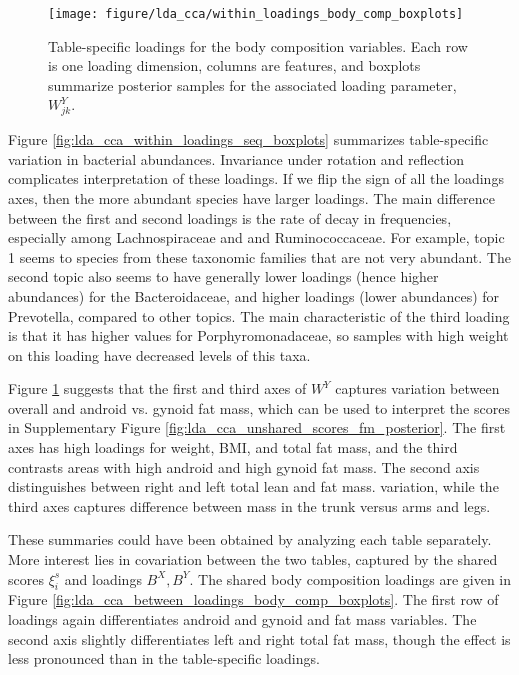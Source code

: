\documentclass{article}
\begin{document}
\begin{figure}
  \centering
  \texttt{[image: figure/lda\_cca/within\_loadings\_body\_comp\_boxplots]}
  \caption{Table-specific loadings for the body composition variables. Each row
    is one loading dimension, columns are features, and boxplots summarize
    posterior samples for the associated loading parameter, $W_{jk}^{Y}$.
  \label{fig:lda_cca_within_loadings_body_comp_boxplots}}
\end{figure}

Figure \ref{fig:lda_cca_within_loadings_seq_boxplots} summarizes table-specific
variation in bacterial abundances. Invariance under rotation and reflection
complicates interpretation of these loadings. If we flip the sign of all the
loadings axes, then the more abundant species have larger loadings. The main
difference between the first and second loadings is the rate of decay in
frequencies, especially among Lachnospiraceae and and Ruminococcaceae. For
example, topic 1 seems to species from these taxonomic families that are not
very abundant. The second topic also seems to have generally lower loadings
(hence higher abundances) for the Bacteroidaceae, and higher loadings (lower
abundances) for Prevotella, compared to other topics. The main characteristic of
the third loading is that it has higher values for Porphyromonadaceae, so
samples with high weight on this loading have decreased levels of this taxa.

Figure \ref{fig:lda_cca_within_loadings_body_comp_boxplots} suggests that the
first and third axes of $W^{Y}$ captures variation between overall and android
vs. gynoid fat mass, which can be used to interpret the scores in Supplementary
Figure \ref{fig:lda_cca_unshared_scores_fm_posterior}. The first axes has high
loadings for weight, BMI, and total fat mass, and the third contrasts areas with
high android and high gynoid fat mass. The second axis distinguishes between
right and left total lean and fat mass. variation, while the third axes captures
difference between mass in the trunk versus arms and legs.

These summaries could have been obtained by analyzing each table separately.
More interest lies in covariation between the two tables, captured by the shared
scores $\xi_{i}^{s}$ and loadings $B^{X}, B^{Y}$. The shared body composition
loadings are given in Figure
\ref{fig:lda_cca_between_loadings_body_comp_boxplots}. The first row of loadings
again differentiates android and gynoid and fat mass variables. The second axis
slightly differentiates left and right total fat mass, though the effect is less
pronounced than in the table-specific loadings.
\end{document}
